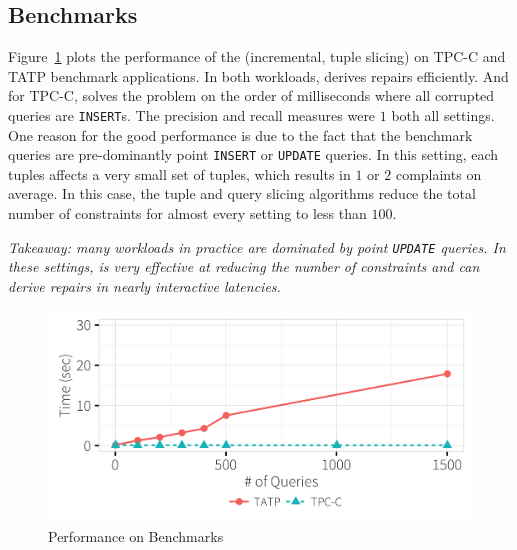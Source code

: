 \subsection{Benchmarks}
\label{sec:experiments:benchmark}

Figure~\ref{f:tpcctatp} plots the performance of the \sys (incremental, tuple slicing)
on TPC-C and TATP benchmark applications.  In both workloads, \sys derives repairs efficiently.
And for TPC-C, \sys solves the problem on the order of milliseconds where all corrupted queries are \texttt{INSERT}s. 
The precision and recall measures were
$1$ both all settings.   One reason for the good performance is due to the fact that the benchmark queries
are pre-dominantly point \texttt{INSERT} or \texttt{UPDATE} queries.  In this setting, each tuples affects a very small set of 
tuples, which results in $1$ or $2$ complaints on average.  In this case, the tuple and query slicing algorithms
reduce the total number of constraints for almost every setting to less than $100$.


{\it Takeaway: many workloads in practice are dominated by point \texttt{UPDATE} queries.  In these settings,
 \sys is very effective at reducing the number of constraints and can derive repairs in nearly
 interactive latencies.}
\begin{figure}[h]
\centering
  \includegraphics[width = .75\columnwidth]{figures/benchmark_time}
  \vspace*{-.2in}
  \caption{Performance on Benchmarks}
  \label{f:tpcctatp} 
  \vspace*{-.1in}
\end{figure}

